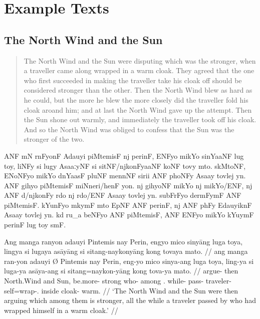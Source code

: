 \chapter{Example Texts}

\section{The North Wind and the Sun}
\label{sec:northwind}
\citep[From][]{becker:northwind}

\blockcquote[After Aesop;][39]{ipa2007}{The North Wind and the Sun were
disputing which was the stronger, when a traveller came along wrapped in a warm
cloak. They agreed that the one who first succeeded in making the traveller
take his cloak off should be considered stronger than the other. Then the North
Wind blew as hard as he could, but the more he blew the more closely did the
traveller fold his cloak aroand him; and at last the North Wind gave up the
attempt. Then the Sun shone out warmly, and immediately the traveller took off
his cloak. And so the North Wind was obliged to confess that the Sun was the
stronger of the two.}

\begin{flushleft}
\noindent\Tagati ANF mN rnFyonF Adauyi piMtemisF nj perinF, ENFyo mikYo
sinYaaNF lug toy, liNFy si lugy AsaaːyNF si sitNF/njkonFyaaNF koNF tovy mto.
skMtoNF, ENoNFyo mikYo dnYaasF pluNF mennNF sirii ANF phoNFy Asaay tovlej yn.
ANF gihyo piM\-temisF miNneri/henF yon. nj gi\-h\-yoNF mikYo nj mikYo/ENF, nj
ANF d/njkonFy rdo nj rdo/ENF Asaay tovlej yn. su\-bFrFyo dermFymF ANF
piMtemisF. kYunFyo mkymF mto EpNF ANF perinF, nj ANF phFy EdauyiknF Asaay
tovlej yn. kd ru\_a beNFyo ANF piMtemisF, ANF ENFyo mikYo kYuymF perinF lug toy
smF.
\end{flushleft}

\medskip

\ex %
\begingl
	\gla Ang manga ranyon adauyi {} Pintemis nay Perin, engyo mico sinyāng 
		luga toya, lingya si lugaya asāyāng si sitang-naykonyāng kong tovaya
		mato. //
	\glb ang manga ran-yon adauyi Ø Pintemis nay Perin, eng-yo mico sinya-ang
		luga toya, ling-ya si luga-ya asāya-ang si sitang=naykon-yāng kong
		tova-ya mato. //
	\glc \AgtT{} \Prog{} argue-\TplN{} then \Top{} North.Wind and Sun,
		be.more-\TsgN{} strong who-\Aarg{} among \TplN{}.\Loc{}
		while-\Loc{} \Rel{} pass-\TsgM{} traveler-\Aarg{} \Rel{}
		self=wrap-\TsgM{}.\Aarg{} inside cloak-\Loc{} warm. //
	\glft `The North Wind and the Sun were then arguing which among them is
		stronger, all the while a traveler passed by who had wrapped himself in
		a warm cloak.' //
\endgl
\xe

